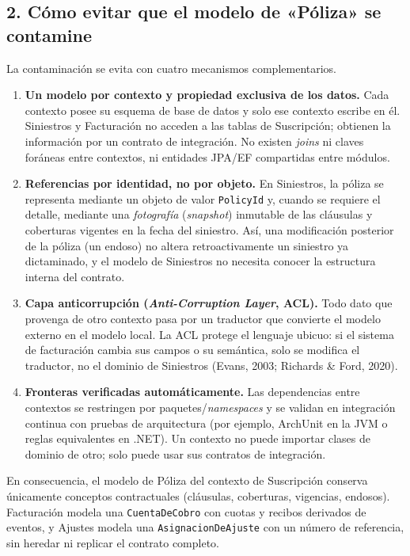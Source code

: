 \documentclass[11pt,a4paper]{article}
\begin{document}
\subsection*{2. Cómo evitar que el modelo de «Póliza» se contamine}

La contaminación se evita con cuatro mecanismos complementarios.

\begin{enumerate}[leftmargin=1.4em]
\item \textbf{Un modelo por contexto y propiedad exclusiva de los datos.} Cada contexto
posee su esquema de base de datos y solo ese contexto escribe en él. Siniestros y
Facturación no acceden a las tablas de Suscripción; obtienen la información por un
contrato de integración. No existen \emph{joins} ni claves foráneas entre contextos, ni
entidades JPA/EF compartidas entre módulos.

\item \textbf{Referencias por identidad, no por objeto.} En Siniestros, la póliza se
representa mediante un objeto de valor \texttt{PolicyId} y, cuando se requiere el detalle,
mediante una \emph{fotografía} (\emph{snapshot}) inmutable de las cláusulas y coberturas
vigentes en la fecha del siniestro. Así, una modificación posterior de la póliza (un
endoso) no altera retroactivamente un siniestro ya dictaminado, y el modelo de Siniestros
no necesita conocer la estructura interna del contrato.

\item \textbf{Capa anticorrupción (\emph{Anti-Corruption Layer}, ACL).} Todo dato que
provenga de otro contexto pasa por un traductor que convierte el modelo externo en el
modelo local. La ACL protege el lenguaje ubicuo: si el sistema de facturación cambia sus
campos o su semántica, solo se modifica el traductor, no el dominio de Siniestros
(Evans, 2003; Richards \& Ford, 2020).

\item \textbf{Fronteras verificadas automáticamente.} Las dependencias entre contextos se
restringen por paquetes/\emph{namespaces} y se validan en integración continua con pruebas de
arquitectura (por ejemplo, ArchUnit en la JVM o reglas equivalentes en .NET). Un contexto
no puede importar clases de dominio de otro; solo puede usar sus contratos de integración.
\end{enumerate}

En consecuencia, el modelo de Póliza del contexto de Suscripción conserva únicamente
conceptos contractuales (cláusulas, coberturas, vigencias, endosos). Facturación modela
una \texttt{CuentaDeCobro} con cuotas y recibos derivados de eventos, y Ajustes modela una
\texttt{AsignacionDeAjuste} con un número de referencia, sin heredar ni replicar el
contrato completo.
\end{document}
